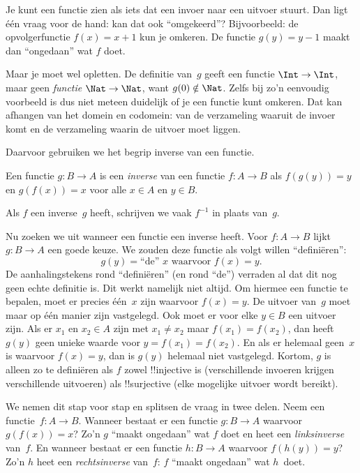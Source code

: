 \documentclass[../../../include/open-logic-section]{subfiles}
\begin{document}

\begin{explain}
Je kunt een functie zien als iets dat een invoer naar een uitvoer
stuurt. Dan ligt één vraag voor de hand: kan dat ook ``omgekeerd''?
Bijvoorbeeld: de opvolgerfunctie $f(x) = x + 1$ kun je omkeren. De
functie $g(y) = y - 1$ maakt dan ``ongedaan'' wat $f$ doet.

Maar je moet wel opletten. De definitie van~$g$ geeft een functie
$\Int \to \Int$, maar geen \emph{functie} $\Nat \to \Nat$, want
$g(0) \notin \Nat$. Zelfs bij zo'n eenvoudig voorbeeld is dus niet
meteen duidelijk of je een functie kunt omkeren. Dat kan afhangen van
het domein en codomein: van de verzameling waaruit de invoer komt en de
verzameling waarin de uitvoer moet liggen.

Daarvoor gebruiken we het begrip inverse van een functie.
\end{explain}

\begin{defn}
Een functie $g \colon B \to A$ is een \emph{inverse} van een functie
$f \colon A \to B$ als $f(g(y)) = y$ en $g(f(x)) = x$ voor alle $x
\in A$ en $y \in B$.
\end{defn}

Als $f$ een inverse~$g$ heeft, schrijven we vaak $f^{-1}$ in plaats
van~$g$.

\begin{explain}
Nu zoeken we uit wanneer een functie een inverse heeft. Voor
$f\colon A \to B$ lijkt $g\colon B \to A$ een goede keuze. We zouden
deze functie als volgt willen ``definiëren'':
\[
g(y) = \text{``de'' $x$ waarvoor $f(x) = y$.}
\]
De aanhalingstekens rond ``definiëren'' (en rond ``de'') verraden al
dat dit nog geen echte definitie is. Dit werkt namelijk niet altijd.
Om hiermee een functie te bepalen, moet er precies één~$x$ zijn
waarvoor $f(x) = y$. De uitvoer van~$g$ moet maar op één manier zijn
vastgelegd. Ook moet er voor elke $y \in B$ een uitvoer zijn. Als er
$x_1$ en $x_2 \in A$ zijn met $x_1 \neq x_2$ maar $f(x_1) = f(x_2)$,
dan heeft $g(y)$ geen unieke waarde voor $y = f(x_1) = f(x_2)$. En als
er helemaal geen~$x$ is waarvoor $f(x) = y$, dan is $g(y)$ helemaal
niet vastgelegd. Kortom, $g$ is alleen zo te definiëren als $f$ zowel
!!{injective} is (verschillende invoeren krijgen verschillende
uitvoeren) als !!{surjective} (elke mogelijke uitvoer wordt bereikt).

We nemen dit stap voor stap en splitsen de vraag in twee delen. Neem
een functie~$f\colon A \to B$. Wanneer bestaat er een functie
$g\colon B \to A$ waarvoor $g(f(x)) = x$? Zo'n $g$ ``maakt ongedaan''
wat $f$ doet en heet een \emph{linksinverse} van~$f$. En wanneer bestaat
er een functie $h\colon B \to A$ waarvoor $f(h(y)) = y$? Zo'n $h$
heet een \emph{rechtsinverse} van~$f$: $f$ ``maakt ongedaan'' wat
$h$~doet.
\end{explain}
\end{document}

